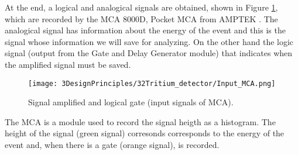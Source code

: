 At the end, a logical and analogical signals are obtained, shown in Figure \ref{fig:InputSignalsMCA}, which are recorded by the MCA 8000D, Pocket MCA from AMPTEK \cite{DataSheetMCA}. The analogical signal has information about the energy of the event and this is the signal whose information we will save for analyzing. On the other hand the logic signal (output from the Gate and Delay Generator module) that indicates when the amplified signal must be saved.

\begin{figure}[htbp]
\centering
\texttt{[image: 3DesignPrinciples/32Tritium\_detector/Input\_MCA.png]}
\caption{Signal amplified and logical gate (input signals of MCA).\label{fig:InputSignalsMCA}}
\end{figure}

The MCA is a module used to record the signal heigth as a histogram. The height of the signal (green signal) corresonds corresponds to the energy of the event and, when there is a gate (orange signal), is recorded.


